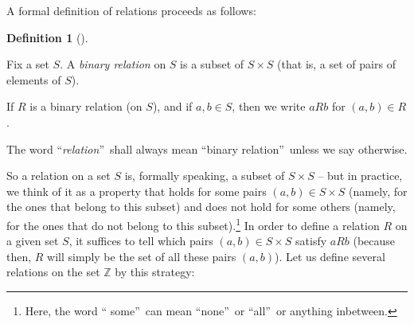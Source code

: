 \documentclass[numbers=enddot,12pt,final,onecolumn,notitlepage]{scrartcl}%
\numberwithin{exer}{subsection}
\theoremstyle{definition}
\newtheorem{defi}[theo]{Definition}
\newenvironment{definition}[1][]
{\begin{defi}[#1]\begin{leftbar}}
{\end{leftbar}\end{defi}}
\begin{document}
A formal definition of relations proceeds as follows:

\begin{definition}
\label{def.eqrel.rel.rel}Fix a set $S$. A \textit{binary relation} on $S$ is a
subset of $S\times S$ (that is, a set of pairs of elements of $S$).

If $R$ is a binary relation (on $S$), and if $a,b\in S$, then we write $aRb$
for $\left(  a,b\right)  \in R$.

The word \textquotedblleft\textit{relation}\textquotedblright\ shall always
mean \textquotedblleft binary relation\textquotedblright\ unless we say otherwise.
\end{definition}

So a relation on a set $S$ is, formally speaking, a subset of $S\times S$ --
but in practice, we think of it as a property that holds for some pairs
$\left(  a,b\right)  \in S\times S$ (namely, for the ones that belong to this
subset) and does not hold for some others (namely, for the ones that do not
belong to this subset).\footnote{Here, the word \textquotedblleft
some\textquotedblright\ can mean \textquotedblleft none\textquotedblright\ or
\textquotedblleft all\textquotedblright\ or anything inbetween.} In order to
define a relation $R$ on a given set $S$, it suffices to tell which pairs
$\left(  a,b\right)  \in S\times S$ satisfy $aRb$ (because then, $R$ will
simply be the set of all these pairs $\left(  a,b\right)  $). Let us define
several relations on the set $\mathbb{Z}$ by this strategy:
\end{document}
